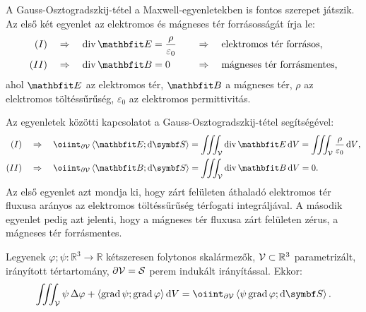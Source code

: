 \documentclass{szb-practice}
\begin{document}
\begin{learnMore}
  A Gauss-Osztogradszkij-tétel a Maxwell-egyenletekben is fontos szerepet
  játszik. Az első két egyenlet az elektromos és mágneses tér forrásosságát
  írja le:
  $$
    \begin{aligned}
      (I)  & \quad \Rightarrow \quad \Div \rvec E = \frac{\rho}{\varepsilon_0}
           &
           & \quad \Rightarrow \quad \text{elektromos tér forrásos,}
      \\
      (II) & \quad \Rightarrow \quad \Div \rvec B = 0
           &
           & \quad \Rightarrow \quad \text{mágneses tér forrásmentes,}
    \end{aligned}
  $$
  ahol $\rvec E$ az elektromos tér, $\rvec B$ a mágneses tér,
  $\rho$ az elektromos töltéssűrűség, $\varepsilon_0$ az elektromos
  permittivitás.

  Az egyenletek közötti kapcsolatot a Gauss-Osztogradszkij-tétel segítségével:
  $$
    \begin{aligned}
      (I)  & \quad \Rightarrow \quad
      \oiint_{\partial \volimage} \scalar{\rvec E}{\dd \surfvec}
      = \iiint_{\volimage} \Div \rvec E \dd \volscalar
      = \iiint_{\volimage} \frac{\rho}{\varepsilon_0} \dd \volscalar
      \text,
      \\
      (II) & \quad \Rightarrow \quad
      \oiint_{\partial \volimage} \scalar{\rvec B}{\dd \surfvec}
      = \iiint_{\volimage} \Div \rvec B \dd \volscalar
      = 0
      \text.
    \end{aligned}
  $$
  Az első egyenlet azt mondja ki, hogy zárt felületen áthaladó elektromos
  tér fluxusa arányos az elektromos töltéssűrűség térfogati integráljával.
  A második egyenlet pedig azt jelenti, hogy a mágneses tér fluxusa zárt
  felületen zérus, a mágneses tér forrásmentes.
\end{learnMore}

\begin{theorem}
  Legyenek $\varphi; \psi: \mathbb R^3 \rightarrow \mathbb R$ kétszeresen
  folytonos skalármezők, $\mathcal{V} \subset \mathbb R^3$ parametrizált,
  irányított tértartomány, $\partial \mathcal{V} = \mathcal{S}$ perem indukált
  irányítással. Ekkor:
  $$
    \iiint_{\volimage}
    \psi \, \Delta \varphi +
    \scalar{\grad \psi}{\grad \varphi}
    \dd \volscalar
    =
    \oiint_{\partial \volimage} \scalar{\psi \grad \varphi}{\dd \surfvec}
    \text.
  $$
\end{theorem}
\end{document}
